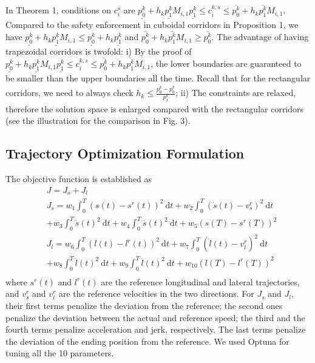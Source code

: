 \documentclass[journal,a4paper,onecolumn,12pt]{IEEEtran}
\begin{document}
In Theorem 1, conditions on $c_{i}^{s}$ are $\underline{p_{0}^{k}}+h_{k}\underline{p_{1}^{k}}M_{i,1} \underline{p_{1}^{k}} \leq c_{i}^{k,s} \leq \overline{p_{0}^{k}}+h_{k}\overline{p_{1}^{k}}M_{i,1}$. Compared to the safety enforcement in cuboidal corridors in Proposition 1, we have $\underline{p_{0}^{k}}+h_{k}\underline{p_{1}^{k}}M_{i,1} \leq \underline{p_{0}^{k}}+h_{k} \underline{p_{1}^{k}}$ and $\overline{p_{0}^{k}}+h_{k}\overline{p_{1}^{k}}M_{i,1} \geq \overline{p_{0}^{k}}$. The advantage of having trapezoidal corridors is twofold: i) By the proof of $\underline{p_{0}^{k}}+h_{k}\underline{p_{1}^{k}}M_{i,1} \underline{p_{1}^{k}} \leq c_{i}^{k,s} \leq \overline{p_{0}^{k}}+h_{k}\overline{p_{1}^{k}}M_{i,1}$, the lower boundaries are guaranteed to be smaller than the upper boundaries all the time. Recall that for the rectangular corridors, we need to always check $h_{k} \leq \frac{\overline{p_{0}^{k}}-p_{0}^{k}}{\underline{p_{1}^{k}}}$; ii) The constraints are relaxed, therefore the solution space is enlarged compared with the rectangular corridors (see the illustration for the comparison in Fig. 3).

\subsection{Trajectory Optimization Formulation}
The objective function is established as
\begin{equation}
 \begin{aligned}
&J = J_s + J_l\\
&J_s = w_{1} \int_{0}^{T}\left(s(t)-s^{r}(t)\right)^{2} \mathrm{~d} t+w_{2} \int_{0}^{T}\left(\dot{s}(t)-v_{s}^{r}\right)^{2} \mathrm{~d} t \\
&+w_{3} \int_{0}^{T} \ddot{s}(t)^{2} \mathrm{~d} t+w_{4} \int_{0}^{T} \dddot{s}(t)^{2} \mathrm{~d} t+w_{5}\left(s(T)-s^{r}(T)\right)^{2}\\
&J_l = w_{6} \int_{0}^{T}\left(l(t)-l^{r}(t)\right)^{2} \mathrm{~d} t+w_{7} \int_{0}^{T}\left(\dot{l}(t)-v_{l}^{r}\right)^{2} \mathrm{~d} t \\
&+w_{8} \int_{0}^{T} \ddot{l}(t)^{2} \mathrm{~d} t+w_{9} \int_{0}^{T} \dddot{l}(t)^{2} \mathrm{~d} t+w_{10}\left(l(T)-l^{r}(T)\right)^{2}\\
\end{aligned}
\end{equation}
where $s^{r}(t)$ and $l^{r}(t)$ are the reference longitudinal and lateral trajectories, and $v^{r}_s$ and $v^{r}_l$ are the reference velocities in the two directions. For $J_s$ and $J_l$, their first terms penalize the deviation from the reference; the second ones penalize the deviation between the actual and reference speed; the third and the fourth terms penalize acceleration and jerk, respectively. The last terms penalize the deviation of the ending position from the reference. We used Optuna \cite{optuna_2019} for tuning all the 10 parameters.
\end{document}
